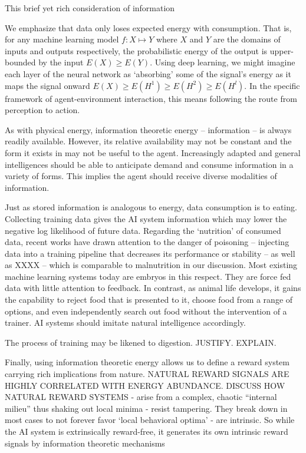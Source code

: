\documentclass{article}
\begin{document}
This brief yet rich consideration of information

We emphasize that data only loses expected energy with consumption. That is, for any machine learning model $f \colon X \mapsto Y$ where $X$ and $Y$ are the domains of inputs and outputs respectively, the probabilistic energy of the output is upper-bounded by the input $E({X}) \ge E({Y})$. Using deep learning, we might imagine each layer of the neural network as ‘absorbing’ some of the signal’s energy as it maps the signal onward $E(X) \ge E(H^1) \ge E({H}^2) \ge E(H^l)$. In the specific framework of agent-environment interaction, this means following the route from perception to action. 

As with physical energy, information theoretic energy -- information -- is always readily available. However, its relative availability may not be constant and the form it exists in may not be useful to the agent. Increasingly adapted and general intelligences should be able to anticipate demand and consume information in a variety of forms. This implies the agent should receive diverse modalities of information.

Just as stored information is analogous to energy, data consumption is to eating. Collecting training data gives the AI system information which may lower the negative log likelihood of future data. Regarding the ‘nutrition’ of consumed data, recent works have drawn attention to the danger of poisoning -- injecting data into a training pipeline that decreases its performance or stability -- as well as XXXX -- which is comparable to malnutrition in our discussion. Most existing machine learning systems today are embryos in this respect. They are force fed data with little attention to feedback. In contrast, as animal life develops, it gains the capability to reject food that is presented to it, choose food from a range of options, and even independently search out food without the intervention of a trainer. AI systems should imitate natural intelligence accordingly.

The process of training may be likened to digestion. JUSTIFY. EXPLAIN.

Finally, using information theoretic energy allows us to define a reward system carrying rich implications from nature. NATURAL REWARD SIGNALS ARE HIGHLY CORRELATED WITH ENERGY ABUNDANCE. DISCUSS HOW NATURAL REWARD SYSTEMS
- arise from a complex, chaotic “internal milieu” thus shaking out local minima
- resist tampering. They break down in most cases to not forever favor ‘local behavioral optima’
- are intrinsic. So while the AI system is extrinsically reward-free, it generates its own intrinsic reward signals by information theoretic mechanisms
\end{document}
